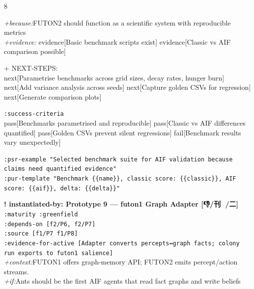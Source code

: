 \documentclass[landscape]{article}
\newcommand{\flexitag}[1]{\textcolor[gray]{0.35}{\textit{#1}}}
\newenvironment{devmapgreenfield}{%
  \def\FrameCommand{\colorbox{devmapgreenfieldbg}}%
  \setlength{\fboxsep}{2pt}%
  \MakeFramed{\advance\hsize-\width \FrameRestore}%
}{\endMakeFramed}
\begin{document}
\begin{paracol}{8}
\begin{devmapgreenfield}
  \flexitag{+because:}FUTON2 should function as a scientific system with reproducible metrics\\
  \flexitag{+evidence:} evidence[Basic benchmark scripts exist] evidence[Classic vs AIF comparison possible]\\
\par
  + NEXT-STEPS:\\
    next[Parametrise benchmarks across grid sizes, decay rates, hunger burn] next[Add variance analysis across seeds] next[Capture golden CSVs for regression] next[Generate comparison plots]\\
\par
  \texttt{:\allowbreak{}success-\allowbreak{}criteria}\\
    pass[Benchmarks parametrised and reproducible] pass[Classic vs AIF differences quantified] pass[Golden CSVs prevent silent regressions] fail[Benchmark results vary unexpectedly]\\
\par
  \texttt{:\allowbreak{}psr-\allowbreak{}example "Selected benchmark suite for AIF validation because claims need quantified evidence"}\\
  \texttt{:\allowbreak{}pur-\allowbreak{}template "Benchmark \{\{name\}\},\allowbreak{} classic score:\allowbreak{} \{\{classic\}\},\allowbreak{} AIF score:\allowbreak{} \{\{aif\}\},\allowbreak{} delta:\allowbreak{} \{\{delta\}\}"}\\
\par
\par
\end{devmapgreenfield}
\begin{devmapgreenfield}
\textbf{! instantiated-by: Prototype 9 — futon1 Graph Adapter [👎/刊 👭/二]}\\
  \texttt{:\allowbreak{}maturity :\allowbreak{}greenfield}\\
  \texttt{:\allowbreak{}depends-\allowbreak{}on [f2/\allowbreak{}P6,\allowbreak{} f2/\allowbreak{}P7]}\\
  \texttt{:\allowbreak{}source [f1/\allowbreak{}P7 f1/\allowbreak{}P8]}\\
  \texttt{:\allowbreak{}evidence-\allowbreak{}for-\allowbreak{}active [Adapter converts percepts↔graph facts;\allowbreak{} colony run exports to futon1 salience]}\\
  \flexitag{+context:}FUTON1 offers graph-memory API; FUTON2 emits percept/action streams.\\
  \flexitag{+if:}Ants should be the first AIF agents that read fact graphs and write beliefs\\

\end{devmapgreenfield}
\end{paracol}
\end{document}

